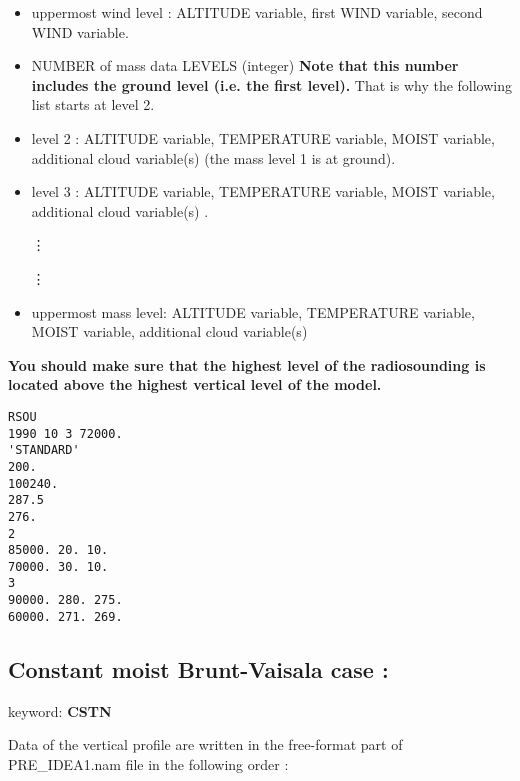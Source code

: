 \begin{itemize}
\hspace{5cm}  \vdots

\hspace{5cm}  \vdots


\item  uppermost wind level : ALTITUDE variable,  first WIND variable, 
second WIND variable.

\item NUMBER of mass data LEVELS (integer) {\bf Note  that this number includes
the ground level (i.e. the first level).} That is why the following list starts
at level 2. 

\item level 2 :  ALTITUDE variable, TEMPERATURE variable,  MOIST
variable, additional cloud variable(s)  (the mass level 1 is at
ground).

\item level 3 : ALTITUDE variable,  TEMPERATURE variable,  MOIST
variable, additional cloud variable(s) .

\hspace{5cm}  \vdots

\hspace{5cm}  \vdots

\item uppermost mass level:  ALTITUDE variable, TEMPERATURE
variable, MOIST variable, additional cloud variable(s) 
\end{itemize}

{\bf You should make sure that the highest level of the radiosounding is located above the highest vertical level of the model.}


\vspace{0.5cm}

\begin{verbatim}
RSOU
1990 10 3 72000.
'STANDARD'
200.
100240.
287.5
276.
2
85000. 20. 10.
70000. 30. 10.
3
90000. 280. 275.
60000. 271. 269.
\end{verbatim}


\subsection{Constant moist Brunt-Vaisala case :}

keyword: {\bf CSTN}

Data of the vertical profile are written in 
the free-format part of PRE\_IDEA1.nam file in the following order :

